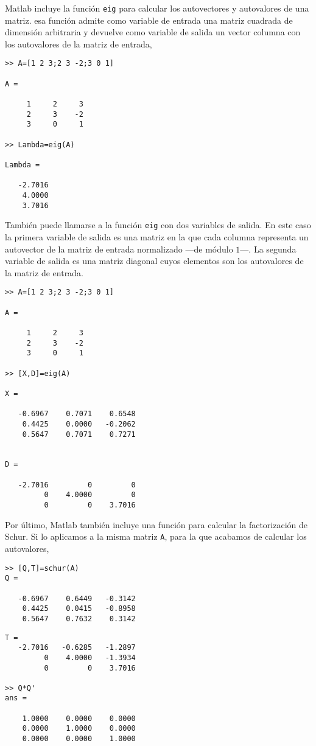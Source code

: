 Matlab incluye la función \texttt{eig} para calcular los autovectores y autovalores de una matriz. esa función admite como variable de entrada una matriz cuadrada de dimensión arbitraria y devuelve como variable de salida un vector columna con los autovalores de la matriz de entrada,

\begin{verbatim}
>> A=[1 2 3;2 3 -2;3 0 1]

A =

     1     2     3
     2     3    -2
     3     0     1

>> Lambda=eig(A)

Lambda =

   -2.7016
    4.0000
    3.7016

\end{verbatim}  
También puede llamarse a la función \texttt{eig} con dos variables de salida. En este caso la primera variable de salida es una matriz en la que cada columna representa un autovector de la matriz de entrada normalizado ---de módulo $1$---. La segunda variable de salida es una matriz diagonal cuyos elementos son los autovalores de la matriz de entrada.

\begin{verbatim}
>> A=[1 2 3;2 3 -2;3 0 1]

A =

     1     2     3
     2     3    -2
     3     0     1

>> [X,D]=eig(A)

X =

   -0.6967    0.7071    0.6548
    0.4425    0.0000   -0.2062
    0.5647    0.7071    0.7271


D =

   -2.7016         0         0
         0    4.0000         0
         0         0    3.7016
\end{verbatim}

Por último, Matlab también incluye una función para calcular la factorización de Schur. Si lo aplicamos a la misma matriz \texttt{A}, para la que acabamos de calcular los autovalores,

\begin{verbatim}
>> [Q,T]=schur(A)
Q =

   -0.6967    0.6449   -0.3142
    0.4425    0.0415   -0.8958
    0.5647    0.7632    0.3142
\end{verbatim}

\begin{verbatim}
T =
   -2.7016   -0.6285   -1.2897
         0    4.0000   -1.3934
         0         0    3.7016

>> Q*Q'
ans =

    1.0000    0.0000    0.0000
    0.0000    1.0000    0.0000
    0.0000    0.0000    1.0000

\end{verbatim}

